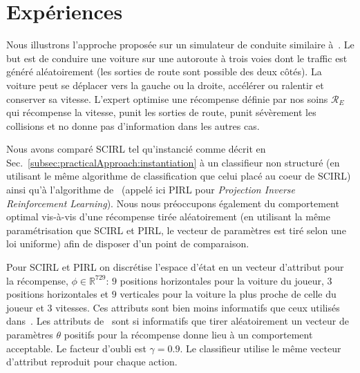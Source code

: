 \documentclass[english,utf8]{./hermes-journal}
\newcommand{\R}{\mathcal{R}}
\begin{document}
\section{Expériences}
\label{sec:experiments}

Nous illustrons l'approche proposée sur un simulateur de conduite similaire à~\cite{Abbeel:2004,Syed:2008:game}.  Le but est de conduire une voiture sur une autoroute à trois voies dont le traffic est généré aléatoirement (les sorties de route sont possible des deux côtés). La voiture peut se déplacer vers la gauche ou la droite, accélérer ou ralentir et conserver sa vitesse. L'expert optimise une récompense définie par nos soins $\R_E$ qui récompense la vitesse, punit les sorties de route, punit sévèrement les collisions et no donne pas d'information dans les autres cas.

Nous avons comparé SCIRL tel qu'instancié comme décrit en
Sec.~\ref{subsec:practicalApproach:instantiation} à un classifieur non structuré (en utilisant le même algorithme de classification que celui placé au coeur de SCIRL) ainsi qu'à l'algorithme de~\cite{Abbeel:2004} (appelé ici PIRL pour \emph{
Projection Inverse Reinforcement Learning}). Nous nous préoccupons également du comportement optimal vis-à-vis d'une récompense tirée aléatoirement (en utilisant la même paramétrisation que SCIRL et PIRL, le vecteur de paramètres est tiré selon une loi uniforme) afin de disposer d'un point de comparaison.

Pour SCIRL et PIRL on discrétise l'espace d'état en un vecteur d'attribut pour la récompense, $\phi\in\mathbb{R}^{729}$: $9$ positions horizontales pour la voiture du joueur, $3$ positions horizontales et $9$ verticales pour la voiture la plus proche de celle du joueur et $3$ vitesses. Ces attributs sont bien moins informatifs que ceux utilisés dans~\cite{Abbeel:2004,Syed:2008:game}. Les attributs de~\cite{Syed:2008:game} sont si informatifs que tirer aléatoirement un vecteur de paramètres $\theta$ positifs pour la récompense donne lieu à un comportement acceptable. Le facteur d'oubli est $\gamma = 0.9$. Le classifieur utilise le même vecteur d'attribut reproduit pour chaque action.
\end{document}
